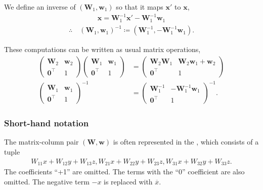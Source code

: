 We define an inverse of $(\bm{W}_{1}, \bm{w}_{1})$ so that it maps $\bm{x}'$ to $\bm{x}$,
\begin{align*}
    \bm{x} = \bm{W}_{1}^{-1}\bm{x}' - \bm{W}_{1}^{-1} \bm{w}_{1}
\end{align*}
\begin{align}
    \therefore \quad
    (\bm{W}_{1}, \bm{w}_{1})^{-1} \coloneqq (\bm{W}_{1}^{-1}, -\bm{W}_{1}^{-1} \bm{w}_{1}).
\end{align}

These computations can be written as usual matrix operations,
\begin{align}
    \begin{pmatrix} \bm{W}_{2} & \bm{w}_{2} \\ \bm{0}^{\top} & 1 \end{pmatrix}
    \begin{pmatrix} \bm{W}_{1} & \bm{w}_{1} \\ \bm{0}^{\top} & 1 \end{pmatrix}
    &=
    \begin{pmatrix} \bm{W}_{2} \bm{W}_{1} & \bm{W}_{2}\bm{w}_{1} + \bm{w}_{2} \\ \bm{0}^{\top} & 1 \end{pmatrix} \\
    \begin{pmatrix} \bm{W}_{1} & \bm{w}_{1} \\ \bm{0}^{\top} & 1 \end{pmatrix}^{-1}
    &=
    \begin{pmatrix} \bm{W}_{1}^{-1} & -\bm{W}_{1}^{-1}\bm{w}_{1} \\ \bm{0}^{\top} & 1 \end{pmatrix}^{-1}.
\end{align}

\subsubsection{Short-hand notation}

The matrix-column pair $(\bm{W}, \bm{w})$ is often represented in the , which consists of a tuple
\begin{align*}
  W_{11} x + W_{12} y + W_{13} z, W_{21} x + W_{22} y + W_{23} z, W_{31} x + W_{32} y + W_{33} z.
\end{align*}
The coefficients ``+1'' are omitted.
The terms with the ``0'' coefficient are also omitted.
The negative term $-x$ is replaced with $\overline{x}$.

